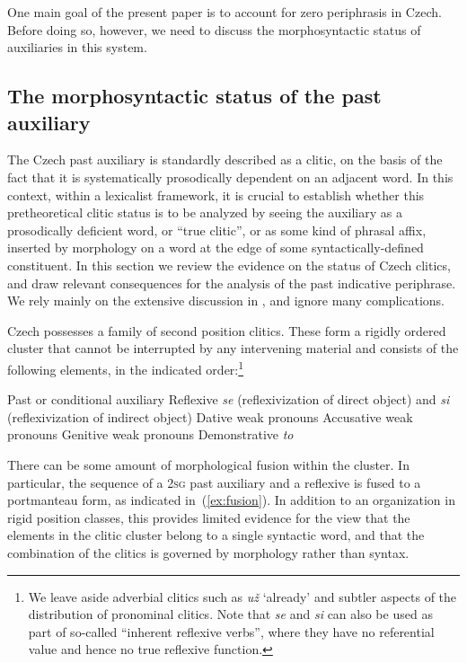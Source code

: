 \documentclass[output=paper]{langsci/langscibook}
\begin{document}
One main goal of the present paper is to account for zero periphrasis in Czech. Before doing so, however, we need to discuss the morphosyntactic status of auxiliaries in this system.

\subsection{The morphosyntactic status of the past auxiliary}
\label{sec:ms}

The Czech past auxiliary is standardly described as a clitic, on the basis of the fact that it is systematically prosodically dependent on an adjacent word. In this context, within a lexicalist framework, it is crucial to establish whether this pretheoretical clitic status is to be analyzed by seeing the auxiliary as a prosodically deficient word, or ``true clitic'', or as some kind of phrasal affix, inserted by morphology on a word at the edge of some syntactically-defined constituent. In this section we review the evidence on the status of Czech clitics, and draw relevant consequences for the analysis of the past indicative periphrase. We rely mainly on the extensive discussion in \citet{Hana07}, and ignore many complications.

Czech possesses a family of second position clitics. These form a  rigidly ordered cluster that cannot be interrupted by any intervening material and consists of the following elements, in the indicated order:\footnote{We leave aside adverbial clitics such as \emph{už} ‘already’ and subtler aspects of the distribution of pronominal clitics. Note that \emph{se} and \emph{si} can also be used as part of so-called ``inherent reflexive verbs'', where they have no referential value and hence no true reflexive function.}

\begin{exe}
\ex\label{ex:cluster}\begin{xlist}
\ex Past or conditional auxiliary
\ex Reflexive \emph{se} (reflexivization of direct object) and \emph{si} (reflexivization of indirect object)
\ex Dative weak pronouns
\ex Accusative weak pronouns
\ex Genitive weak pronouns
\ex Demonstrative \emph{to}
\end{xlist}
\end{exe}

There can be some amount of morphological fusion within the cluster. In particular, the sequence of a \textsc{2sg} past auxiliary and a reflexive is fused to a portmanteau form, as indicated in~(\ref{ex:fusion}). In addition to an organization in rigid position classes, this provides limited evidence for the view that the elements in the clitic cluster belong to a single syntactic word, and that the combination of the clitics is governed by morphology rather than syntax.
\end{document}
